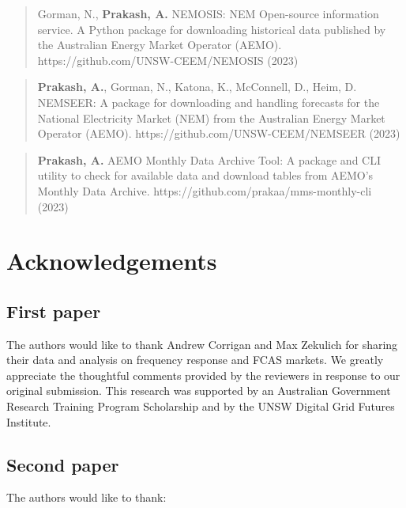 \documentclass[12pt,a4paper,]{report}
\begin{document}
\begin{quote}
Gorman, N., \textbf{Prakash, A.} NEMOSIS: NEM Open-source information
service. A Python package for downloading historical data published by
the Australian Energy Market Operator (AEMO).
https://github.com/UNSW-CEEM/NEMOSIS (2023)
\end{quote}

\begin{quote}
\textbf{Prakash, A.}, Gorman, N., Katona, K., McConnell, D., Heim, D.
NEMSEER: A package for downloading and handling forecasts for the
National Electricity Market (NEM) from the Australian Energy Market
Operator (AEMO). https://github.com/UNSW-CEEM/NEMSEER (2023)
\end{quote}

\begin{quote}
\textbf{Prakash, A.} AEMO Monthly Data Archive Tool: A package and CLI
utility to check for available data and download tables from AEMO's
Monthly Data Archive. https://github.com/prakaa/mms-monthly-cli (2023)
\end{quote}

\hypertarget{acknowledgements}{%
\chapter*{Acknowledgements}\label{acknowledgements}}

\hypertarget{first-paper}{%
\section*{First paper}\label{first-paper}}

The authors would like to thank Andrew Corrigan and Max Zekulich for
sharing their data and analysis on frequency response and FCAS markets.
We greatly appreciate the thoughtful comments provided by the reviewers
in response to our original submission. This research was supported by
an Australian Government Research Training Program Scholarship and by
the UNSW Digital Grid Futures Institute.

\hypertarget{second-paper}{%
\section*{Second paper}\label{second-paper}}

The authors would like to thank:
\end{document}
